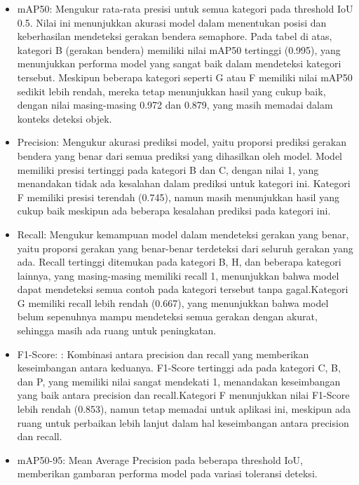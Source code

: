 \documentclass[12pt,a4paper]{article}
\begin{document}
\begin{adjustwidth}{3em}{0pt} 

\begin{itemize}
    \item mAP50: Mengukur rata-rata presisi untuk semua kategori pada threshold IoU 0.5. Nilai ini menunjukkan akurasi model dalam menentukan posisi dan keberhasilan mendeteksi gerakan bendera semaphore. Pada tabel di atas, kategori B (gerakan bendera) memiliki nilai mAP50 tertinggi (0.995), yang menunjukkan performa model yang sangat baik dalam mendeteksi kategori tersebut. Meskipun beberapa kategori seperti G atau F memiliki nilai mAP50 sedikit lebih rendah, mereka tetap menunjukkan hasil yang cukup baik, dengan nilai masing-masing 0.972 dan 0.879, yang masih memadai dalam konteks deteksi objek.

    
    \item Precision: Mengukur akurasi prediksi model, yaitu proporsi prediksi gerakan bendera yang benar dari semua prediksi yang dihasilkan oleh model. Model memiliki presisi tertinggi pada kategori B dan C, dengan nilai 1, yang menandakan tidak ada kesalahan dalam prediksi untuk kategori ini. Kategori F memiliki presisi terendah (0.745), namun masih menunjukkan hasil yang cukup baik meskipun ada beberapa kesalahan prediksi pada kategori ini.

    
    \item Recall: Mengukur kemampuan model dalam mendeteksi gerakan yang benar, yaitu proporsi gerakan yang benar-benar terdeteksi dari seluruh gerakan yang ada. Recall tertinggi ditemukan pada kategori B, H, dan beberapa kategori lainnya, yang masing-masing memiliki recall 1, menunjukkan bahwa model dapat mendeteksi semua contoh pada kategori tersebut tanpa gagal.Kategori G memiliki recall lebih rendah (0.667), yang menunjukkan bahwa model belum sepenuhnya mampu mendeteksi semua gerakan dengan akurat, sehingga masih ada ruang untuk peningkatan.
    
    \item F1-Score: : Kombinasi antara precision dan recall yang memberikan keseimbangan antara keduanya. F1-Score tertinggi ada pada kategori C, B, dan P, yang memiliki nilai sangat mendekati 1, menandakan keseimbangan yang baik antara precision dan recall.Kategori F menunjukkan nilai F1-Score lebih rendah (0.853), namun tetap memadai untuk aplikasi ini, meskipun ada ruang untuk perbaikan lebih lanjut dalam hal keseimbangan antara precision dan recall.

    \item mAP50-95: Mean Average Precision pada beberapa threshold IoU, memberikan gambaran performa model pada variasi toleransi deteksi.
    

\end{itemize}
\end{adjustwidth}
\end{document}
